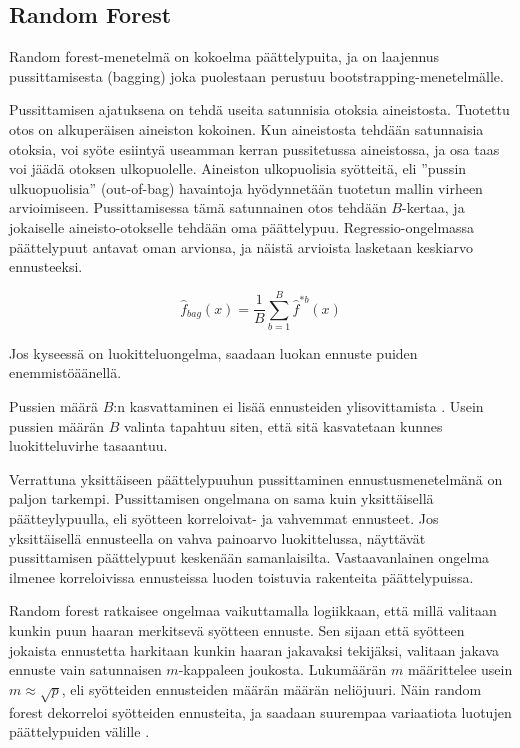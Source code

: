 \documentclass[finnish,twoside,openright]{HYgraduMLDS}
\begin{document}
\subsection{Random Forest}

Random forest-menetelmä on kokoelma päättelypuita, ja on laajennus pussittamisesta (bagging) \cite{james2013ISLR} joka puolestaan perustuu bootstrapping-menetelmälle. 

Pussittamisen ajatuksena on tehdä useita satunnisia otoksia aineistosta. Tuotettu otos on alkuperäisen aineiston kokoinen. Kun aineistosta tehdään satunnaisia otoksia, voi syöte esiintyä useamman kerran pussitetussa aineistossa, ja osa taas voi jäädä otoksen ulkopuolelle. Aineiston ulkopuolisia syötteitä, eli ''pussin ulkuopuolisia''  (out-of-bag) havaintoja hyödynnetään tuotetun mallin virheen arvioimiseen. Pussittamisessa tämä satunnainen otos tehdään $B$-kertaa, ja jokaiselle aineisto-otokselle tehdään oma päättelypuu. Regressio-ongelmassa päättelypuut antavat oman arvionsa, ja näistä arvioista lasketaan keskiarvo ennusteeksi.

\begin{equation}
    \hat{f}_{bag}(x) = \frac{1}{B} \sum^B_{b=1} \hat{f}^{*b}(x)
\end{equation}

Jos kyseessä on luokitteluongelma, saadaan luokan ennuste puiden enemmistöäänellä. \cite{james2013ISLR} 

Pussien määrä $B$:n kasvattaminen ei lisää ennusteiden ylisovittamista \cite{james2013ISLR}. Usein pussien määrän $B$ valinta tapahtuu siten, että sitä kasvatetaan kunnes luokitteluvirhe tasaantuu. 

Verrattuna yksittäiseen päättelypuuhun pussittaminen ennustusmenetelmänä on paljon tarkempi. Pussittamisen ongelmana on sama kuin yksittäisellä päätteylypuulla, eli syötteen korreloivat- ja vahvemmat ennusteet. Jos yksittäisellä ennusteella on vahva painoarvo luokittelussa, näyttävät pussittamisen päättelypuut keskenään samanlaisilta. Vastaavanlainen ongelma ilmenee korreloivissa ennusteissa luoden toistuvia rakenteita päättelypuissa.

Random forest ratkaisee ongelmaa vaikuttamalla logiikkaan, että millä valitaan kunkin puun haaran merkitsevä syötteen ennuste. Sen sijaan että syötteen jokaista ennustetta harkitaan kunkin haaran jakavaksi tekijäksi, valitaan jakava ennuste vain satunnaisen $m$-kappaleen joukosta. Lukumäärän $m$ määrittelee usein $m \approx \sqrt{p}$, eli syötteiden ennusteiden määrän määrän neliöjuuri. Näin random forest dekorreloi syötteiden ennusteita, ja saadaan suurempaa variaatiota luotujen päättelypuiden välille \cite{james2013ISLR}.
\end{document}
